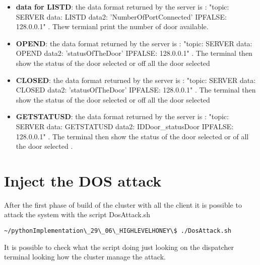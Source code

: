 \begin{itemize}
\item \textbf{data for LISTD}: the data format returned by the server is : "topic: SERVER data: LISTD data2: 'NumberOfPortConnected' IPFALSE: 128.0.0.1" . Thew termianl print the number of door available.
\item \textbf{OPEND}: the data format returned by the server is : "topic: SERVER data: OPEND data2: 'statusOfTheDoor' IPFALSE: 128.0.0.1" . The terminal then show the status of the door selected or off all the door selected
\item \textbf{CLOSED}: the data format returned by the server is : "topic: SERVER data: CLOSED data2: 'statusOfTheDoor' IPFALSE: 128.0.0.1" . The terminal then show the status of the door selected or off all the door selected
\item \textbf{GETSTATUSD}:  the data format returned by the server is : "topic: SERVER data: GETSTATUSD data2: IDDoor\_statusDoor IPFALSE: 128.0.0.1" . The terminal then show the status of the door selected or of all the door selected .
\end{itemize}
\section{Inject the DOS attack}
After the first phase of build of the cluster with all the client it is possible to attack the system with the script DosAttack.sh \begin{verbatim}~/pythonImplementation\_29\_06\_HIGHLEVELHONEY\$ ./DosAttack.sh\end{verbatim}
It is possible to check what the script doing just looking on the dispatcher terminal looking how the cluster manage the attack.

